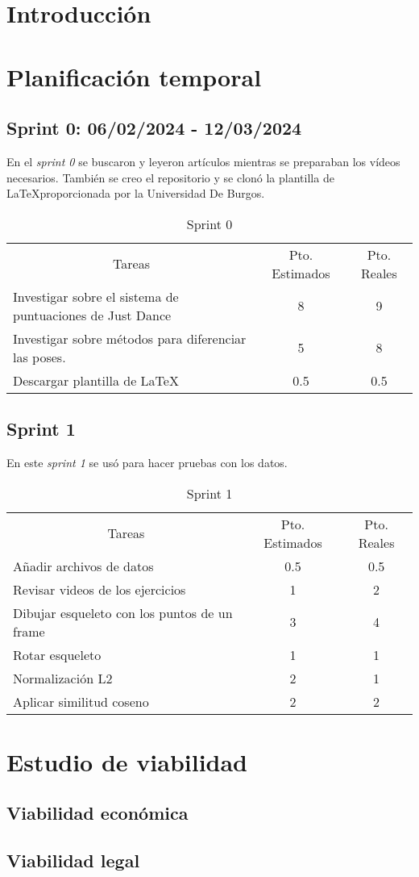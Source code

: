 
\section{Introducción}

\section{Planificación temporal}

\subsection{Sprint 0: 06/02/2024 - 12/03/2024}
En el \textit{sprint 0} se buscaron y leyeron artículos mientras se preparaban los vídeos necesarios. También se creo el repositorio y se clonó la plantilla de \LaTeX proporcionada por la Universidad De Burgos.

\begin{table}[H]
	\begin{tabular}{lcc}
		\multicolumn{1}{c}{Tareas} & Pto. Estimados & Pto. Reales\\
		Investigar sobre el sistema de puntuaciones de Just Dance & 8 & 9 \\
	 	Investigar sobre métodos para diferenciar las poses. & 5 & 8 \\
	 	Descargar plantilla de \LaTeX & 0.5 & 0.5 \\
	\end{tabular}
\caption{Sprint 0}
\label{sprint0}
\end{table}

\subsection{Sprint 1}
En este \textit{sprint 1} se usó para hacer pruebas con los datos.

\begin{table}[H]
	\begin{tabular}{lcc}
		\multicolumn{1}{c}{Tareas} & Pto. Estimados & Pto. Reales\\
		Añadir archivos de datos & 0.5 & 0.5 \\
		Revisar videos de los ejercicios & 1 & 2 \\
		Dibujar esqueleto con los puntos de un frame & 3 & 4 \\
		Rotar esqueleto & 1 & 1 \\
		Normalización L2 & 2 & 1 \\
		Aplicar similitud coseno & 2 & 2 \\
		
	\end{tabular}
	\caption{Sprint 1}
	\label{sprint1}
\end{table}

\section{Estudio de viabilidad}

\subsection{Viabilidad económica}

\subsection{Viabilidad legal}


